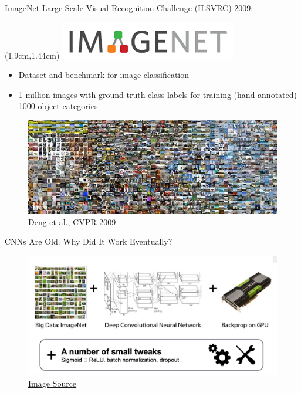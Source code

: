 \documentclass[serif, aspectratio=169]{beamer}
\begin{document}
\begin{frame}{ImageNet Large-Scale Visual Recognition Challenge (ILSVRC)}
	2009:
	\begin{textblock*}{5cm}(1.9cm,1.44cm) %
		\includegraphics[keepaspectratio, scale=0.2]{pic/imagenet_logo}
	\end{textblock*}
	\begin{itemize}
		\item Dataset and benchmark for image classification
		\item 1 million images with ground truth class labels for training (hand-annotated) 1000 object categories
	\end{itemize}
	\begin{figure}[htpb]
		\begin{center}
			\includegraphics[keepaspectratio, scale=0.35]{pic/imagenet_images}
			\caption*{\scriptsize Deng et al., CVPR 2009}
		\end{center}
	\end{figure}
\end{frame}

\begin{frame}{CNNs Are Old. Why Did It Work Eventually?}
	\begin{figure}[htpb]
		\begin{center}
			\includegraphics[keepaspectratio, scale=0.37]{pic/gpu}
			\caption*{\scriptsize \href{http://www.andreykurenkov.com/writing/ai/a-brief-history-of-neural-nets-and-deep-learning-part-4}{\color{blue}Image Source}}
		\end{center}
	\end{figure}
\end{frame}
\end{document}
